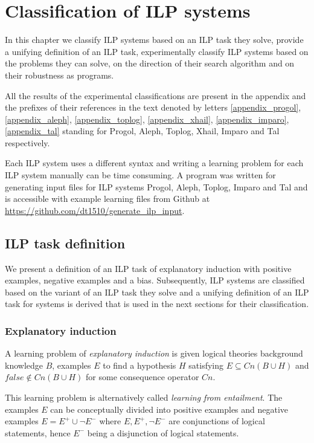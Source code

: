 \chapter{Classification of ILP systems}\label{chap:classification_of_ilp_systems}
In this chapter we classify ILP systems based on an ILP task they solve, provide a unifying definition of an ILP task, experimentally classify ILP systems based on the problems they can solve, on the direction of their search algorithm and on their robustness as programs.

All the results of the experimental classifications are present in the appendix and the prefixes of their references in the text denoted by letters
\ref{appendix_progol}, \ref{appendix_aleph}, \ref{appendix_toplog}, \ref{appendix_xhail}, \ref{appendix_imparo}, \ref{appendix_tal} standing for
Progol, Aleph, Toplog, Xhail, Imparo and Tal respectively.

Each ILP system uses a different syntax and writing a learning problem for each ILP system manually can be time consuming. A program  was written  for generating input files for ILP systems Progol, Aleph, Toplog, Imparo and Tal and is accessible with example learning files from Github at 
\url{https://github.com/dt1510/generate_ilp_input}.

\section{ILP task definition}\label{sec:ilp_task_definition}
We present a definition of an ILP task of explanatory induction with positive examples, negative examples and a bias. Subsequently, ILP systems are classified based on the variant of an ILP task they solve and a unifying definition of an ILP task for systems is derived that is used in the next sections for their classification.

\subsection{Explanatory induction\cite{yamamoto2012inverse}}
\begin{defn}\cite{flach1996rationality} A learning problem of \emph{explanatory induction} is given logical theories background knowledge $B$, examples $E$ to find a hypothesis $H$ satisfying $E \subseteq Cn(B \cup H)$ and $false \not\in Cn(B \cup H)$ for some consequence operator $Cn$.
\end{defn}

This learning problem is alternatively called \emph{learning from entailment}\cite{muggleton1995inverse}\cite{de1997logical}. The examples $E$ can be conceptually divided into positive examples and negative examples $E=E^{+} \cup \neg E^{-}$ where $E, E^{+}, \neg E^{-}$ are conjunctions of logical statements, hence $E^{-}$ being a disjunction of logical statements.

